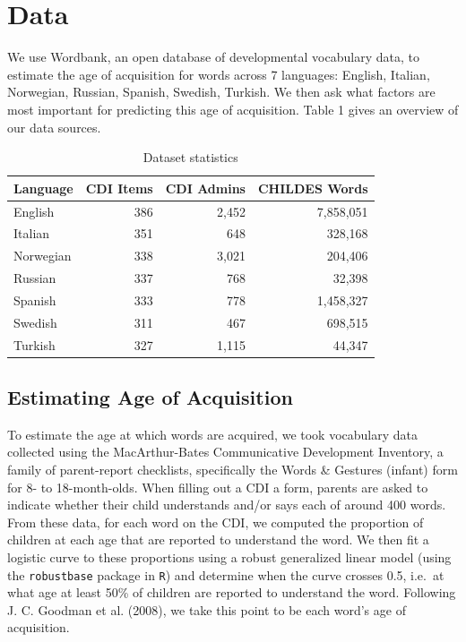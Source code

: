 \documentclass[10pt, letterpaper]{article}
\begin{document}
\section{Data}\label{data}

We use Wordbank, an open database of developmental vocabulary data, to
estimate the age of acquisition for words across 7 languages: English,
Italian, Norwegian, Russian, Spanish, Swedish, Turkish. We then ask what
factors are most important for predicting this age of acquisition. Table
1 gives an overview of our data sources.

\setlength\tabcolsep{3pt}

\begin{table}[hb]
\centering
\begin{tabular}{lrrr}
  \hline
Language & CDI Items & CDI Admins & CHILDES Words \\ 
  \hline
English & 386 & 2,452 & 7,858,051 \\ 
  Italian & 351 & 648 & 328,168 \\ 
  Norwegian & 338 & 3,021 & 204,406 \\ 
  Russian & 337 & 768 & 32,398 \\ 
  Spanish & 333 & 778 & 1,458,327 \\ 
  Swedish & 311 & 467 & 698,515 \\ 
  Turkish & 327 & 1,115 & 44,347 \\ 
   \hline
\end{tabular}
\caption{Dataset statistics} 
\end{table}

\subsection{Estimating Age of
Acquisition}\label{estimating-age-of-acquisition}

To estimate the age at which words are acquired, we took vocabulary data
collected using the MacArthur-Bates Communicative Development Inventory,
a family of parent-report checklists, specifically the Words \& Gestures
(infant) form for 8- to 18-month-olds. When filling out a CDI a form,
parents are asked to indicate whether their child understands and/or
says each of around 400 words. From these data, for each word on the
CDI, we computed the proportion of children at each age that are
reported to understand the word. We then fit a logistic curve to these
proportions using a robust generalized linear model (using the
\texttt{robustbase} package in \texttt{R}) and determine when the curve
crosses 0.5, i.e.~at what age at least 50\% of children are reported to
understand the word. Following J. C. Goodman et al. (2008), we take this
point to be each word's age of acquisition.
\end{document}
